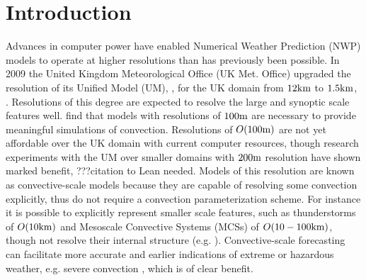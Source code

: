 \documentclass[times]{qjrms4}
\begin{document}

\maketitle


\section{Introduction}\label{intro} 

Advances in computer power have enabled Numerical Weather Prediction (NWP) models to 
operate at higher resolutions than has previously been possible.  
%
In 2009 the United Kingdom Meteorological Office (UK Met. Office) upgraded the 
resolution of its Unified Model (UM), \citep{davies_2005}, for the UK domain from $12 \rm{km}$ to $1.5 \rm {km}$,
\citep{dixon_2009}. 
%
Resolutions of this degree are expected to resolve the large and synoptic scale features well.
\cite{bryan_2003} find that models with resolutions of $100 \rm {m} $ are necessary 
to provide meaningful simulations of convection. 
%
Resolutions of $O(100\rm{m})$ are not yet affordable over the UK domain with current computer resources, though research experiments with the UM over smaller domains with  $200 \rm{m}$ resolution have shown marked benefit, ???citation to Lean needed. 
%
Models of this resolution are known as convective-scale models because they are capable of 
resolving some convection explicitly, thus do not require a convection parameterization scheme.  
%
For instance it is possible to explicitly represent smaller scale features, 
such as thunderstorms of $O(10 \rm{km})$ 
and Mesoscale Convective Systems (MCSs) of $O(10-100 \rm{km})$, though not resolve their 
internal structure (e.g. \cite{bryan_2003, clark_2005, lean_2008}).  
%
Convective-scale forecasting can facilitate more accurate and earlier indications of extreme or hazardous 
weather, e.g. severe convection \citep{lean_2008}, which is of clear benefit.  
\end{document}
